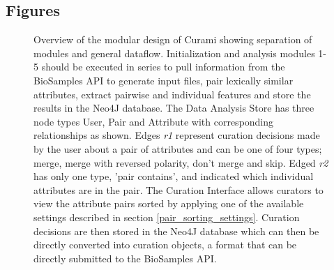\documentclass{bmcart}
\begin{document}
\begin{backmatter}




\section*{Figures}
  \begin{figure}[h!]
  \caption{
      Overview of the modular design of Curami showing separation of modules and general dataflow. Initialization and analysis modules 1-5 should be executed in series to pull information from the BioSamples API to generate input files, pair lexically similar attributes, extract pairwise and individual features and store the results in the Neo4J database. The Data Analysis Store has three node types User, Pair and Attribute with corresponding relationships as shown. Edges \textit{r1} represent curation decisions made by the user about a pair of attributes and can be one of four types; merge, merge with reversed polarity, don't merge and skip. Edged \textit{r2} has only one type, 'pair contains', and indicated which individual attributes are in the pair. The Curation Interface allows curators to view the attribute pairs sorted by applying one of the available settings described in section \ref{pair_sorting_settings}. Curation decisions are then stored in the Neo4J database which can then be directly converted into curation objects, a format that can be directly submitted to the BioSamples API.}
\label{fig:workflow}
\end{figure}


\end{backmatter}
\end{document}
